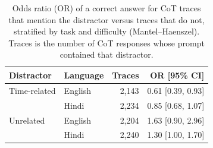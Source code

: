 \begin{table}[ht]
\centering
\small
\begin{tabular}{llrr}
\toprule
Distractor & Language & Traces & OR [95\% CI] \\
\midrule
Time-related & English & 2,143 & 0.61 [0.39, 0.93] \\
 & Hindi & 2,234 & 0.85 [0.68, 1.07] \\
\midrule
Unrelated & English & 2,204 & 1.63 [0.90, 2.96] \\
 & Hindi & 2,240 & 1.30 [1.00, 1.70] \\
\bottomrule
\end{tabular}
\caption{Odds ratio (OR) of a correct answer for CoT traces that mention the distractor versus traces that do not, stratified by task and difficulty (Mantel--Haenszel). Traces is the number of CoT responses whose prompt contained that distractor.}
\label{tab:mention-or}
\end{table}
